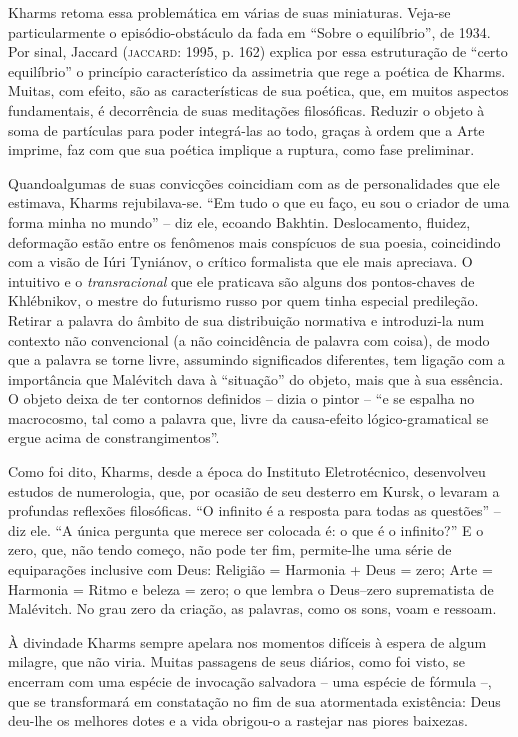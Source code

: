 Kharms retoma essa problemática em várias de suas miniaturas. Veja-se
particularmente o episódio-obstáculo da fada em ``Sobre o equilíbrio'',
de 1934. Por sinal, Jaccard (\textsc{jaccard}: 1995, p. 162) explica por
essa estruturação de ``certo equilíbrio'' o princípio característico da
assimetria que rege a poética de Kharms. Muitas, com efeito, são as
características de sua poética, que, em muitos aspectos fundamentais, é
decorrência de suas meditações filosóficas. Reduzir o objeto à soma de
partículas para poder integrá-las ao todo, graças à ordem que a Arte
imprime, faz com que sua poética implique a ruptura, como fase
preliminar.

Quandoalgumas de suas convicções coincidiam com as de personalidades que
ele estimava, Kharms rejubilava-se. ``Em tudo o que eu faço, eu sou o
criador de uma forma minha no mundo'' -- diz ele, ecoando Bakhtin.
Deslocamento, fluidez, deformação estão entre os fenômenos mais
conspícuos de sua poesia, coincidindo com a visão de Iúri Tyniánov, o
crítico formalista que ele mais apreciava. O intuitivo e o
\emph{transracional} que ele praticava são alguns dos pontos-chaves de
Khlébnikov, o mestre do futurismo russo por quem tinha especial
predileção. Retirar a palavra do âmbito de sua distribuição normativa e
introduzi-la num contexto não convencional (a não coincidência de
palavra com coisa), de modo que a palavra se torne livre, assumindo
significados diferentes, tem ligação com a importância que Malévitch
dava à ``situação'' do objeto, mais que à sua essência. O objeto deixa
de ter contornos definidos -- dizia o pintor -- ``e se espalha no
macrocosmo, tal como a palavra que, livre da causa-efeito
lógico-gramatical se ergue acima de constrangimentos''.

Como foi dito, Kharms, desde a época do Instituto Eletrotécnico,
desenvolveu estudos de numerologia, que, por ocasião de seu desterro em
Kursk, o levaram a profundas reflexões filosóficas. ``O infinito é a
resposta para todas as questões'' -- diz ele. ``A única pergunta que
merece ser colocada é: o que é o infinito?'' E o zero, que, não tendo
começo, não pode ter fim, permite-lhe uma série de equiparações
inclusive com Deus: Religião = Harmonia + Deus = zero; Arte = Harmonia =
Ritmo e beleza = zero; o que lembra o Deus--zero suprematista de
Malévitch. No grau zero da criação, as palavras, como os sons, voam e
ressoam.

À divindade Kharms sempre apelara nos momentos difíceis à espera de
algum milagre, que não viria. Muitas passagens de seus diários, como foi
visto, se encerram com uma espécie de invocação salvadora -- uma espécie
de fórmula --, que se transformará em constatação no fim de sua
atormentada existência: Deus deu-lhe os melhores dotes e a vida
obrigou-o a rastejar nas piores baixezas.

